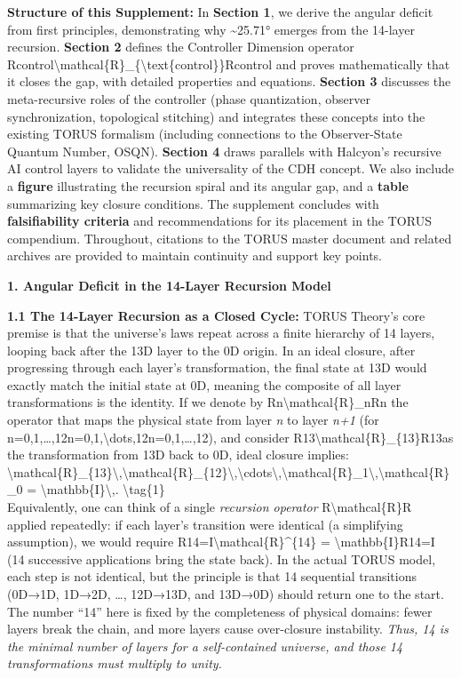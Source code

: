 \documentclass[]{article}
\begin{document}
\textbf{Structure of this Supplement:} In \textbf{Section 1}, we derive
the angular deficit from first principles, demonstrating why
\textasciitilde{}25.71° emerges from the 14-layer recursion.
\textbf{Section 2} defines the Controller Dimension operator
Rcontrol\textbackslash{}mathcal\{R\}\_\{\textbackslash{}text\{control\}\}Rcontrol​
and proves mathematically that it closes the gap, with detailed
properties and equations. \textbf{Section 3} discusses the
meta-recursive roles of the controller (phase quantization, observer
synchronization, topological stitching) and integrates these concepts
into the existing TORUS formalism (including connections to the
Observer-State Quantum Number, OSQN). \textbf{Section 4} draws parallels
with Halcyon's recursive AI control layers to validate the universality
of the CDH concept. We also include a \textbf{figure} illustrating the
recursion spiral and its angular gap, and a \textbf{table} summarizing
key closure conditions. The supplement concludes with
\textbf{falsifiability criteria} and recommendations for its placement
in the TORUS compendium. Throughout, citations to the TORUS master
document and related archives are provided to maintain continuity and
support key points.

\textbf{1. Angular Deficit in the 14-Layer Recursion Model}

\textbf{1.1 The 14-Layer Recursion as a Closed Cycle:} TORUS Theory's
core premise is that the universe's laws repeat across a finite
hierarchy of 14 layers, looping back after the 13D layer to the 0D
origin​. In an ideal closure, after progressing through each layer's
transformation, the final state at 13D would exactly match the initial
state at 0D, meaning the composite of all layer transformations is the
identity. If we denote by Rn\textbackslash{}mathcal\{R\}\_nRn​ the
operator that maps the physical state from layer \emph{n} to layer
\emph{n+1} (for
n=0,1,\ldots{},12n=0,1,\textbackslash{}dots,12n=0,1,\ldots{},12), and
consider R13\textbackslash{}mathcal\{R\}\_\{13\}R13​ as the
transformation from 13D back to 0D, ideal closure implies:\\
\textbackslash{}mathcal\{R\}\_\{13\}\textbackslash{},\textbackslash{}mathcal\{R\}\_\{12\}\textbackslash{},\textbackslash{}cdots\textbackslash{},\textbackslash{}mathcal\{R\}\_1\textbackslash{},\textbackslash{}mathcal\{R\}\_0
= \textbackslash{}mathbb\{I\}\textbackslash{},.
\textbackslash{}tag\{1\}\\
Equivalently, one can think of a single \emph{recursion operator}
R\textbackslash{}mathcal\{R\}R applied repeatedly: if each layer's
transition were identical (a simplifying assumption), we would require
R14=I\textbackslash{}mathcal\{R\}\^{}\{14\} =
\textbackslash{}mathbb\{I\}R14=I (14 successive applications bring the
state back)​. In the actual TORUS model, each step is not identical, but
the principle is that 14 sequential transitions (0D→1D, 1D→2D, \ldots{},
12D→13D, and 13D→0D) should return one to the start. The number ``14''
here is fixed by the completeness of physical domains: fewer layers
break the chain, and more layers cause over-closure instability​.
\emph{Thus, 14 is the minimal number of layers for a self-contained
universe, and those 14 transformations must multiply to unity.}
\end{document}

